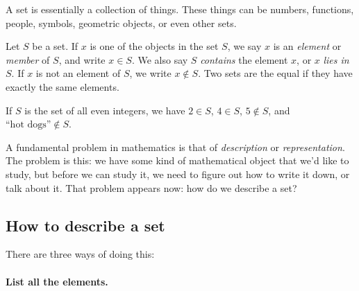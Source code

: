 \documentclass{tufte-book}
\begin{document}
A set is essentially a collection of things. These things can be numbers, functions, people, symbols, geometric objects, or even other sets. 

\begin{definition}
  Let $S$ be a set. If $x$ is one of the objects in the set $S$, we say $x$ is an \emph{element} or \emph{member} of $S$, and write $x \in S$. We also say $S$ \emph{contains} the element $x$, or $x$ \emph{lies in} $S$. If $x$ is not an element of $S$, we write $x \notin S$. Two sets are the equal if they have exactly the same elements.
\end{definition}

If $S$ is the set of all even integers, we have $2 \in S$, $4 \in S$, $5 \notin S$, and $\text{``hot dogs''} \notin S$.

A fundamental problem in mathematics is that of \emph{description} or \emph{representation}. The problem is this: we have some kind of mathematical object that we'd like to study, but before we can study it, we need to figure out how to write it down, or talk about it. That problem appears now: how do we describe a set?

\subsection{How to describe a set}
\label{sec:how-describe-set}

There are three ways of doing this:

\paragraph{List all the elements.}
\label{sec:list-all-elements}
\end{document}
